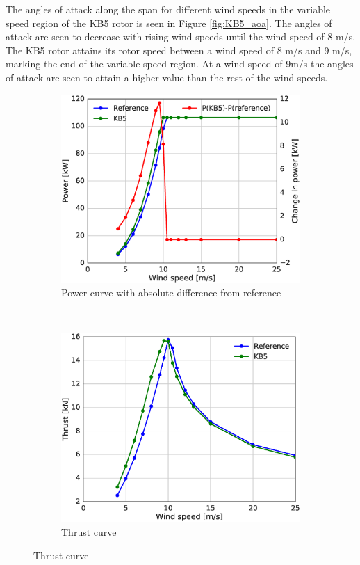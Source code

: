 The angles of attack along the span for different wind speeds in the variable speed region of the KB5 rotor is seen in Figure \ref{fig:KB5_aoa}. The angles of attack are seen to decrease with rising wind speeds until the wind speed of 8 m/s. The KB5 rotor attains its rotor speed between a wind speed of 8 m/s and 9 m/s, marking the end of the variable speed region. At a wind speed of 9m/s the angles of attack are seen to attain a higher value than the rest of the wind speeds. %
\begin{figure}[tph]
\begin{subfigure}{0.50\textwidth}
\includegraphics[width=\linewidth]{figures/KB6_final/KB5_power_diff_HS2.eps}
\caption{Power curve with absolute difference from reference}
\label{subfig:KB5_pcurve}
\end{subfigure}
 ~
\begin{subfigure}{0.50\textwidth}
\includegraphics[width=\linewidth]{figures/KB6_final/KB5_thrust_HS2.eps}
\caption{Thrust curve}
\label{subfig:KB5_thrust}
\end{subfigure}


\end{figure}
